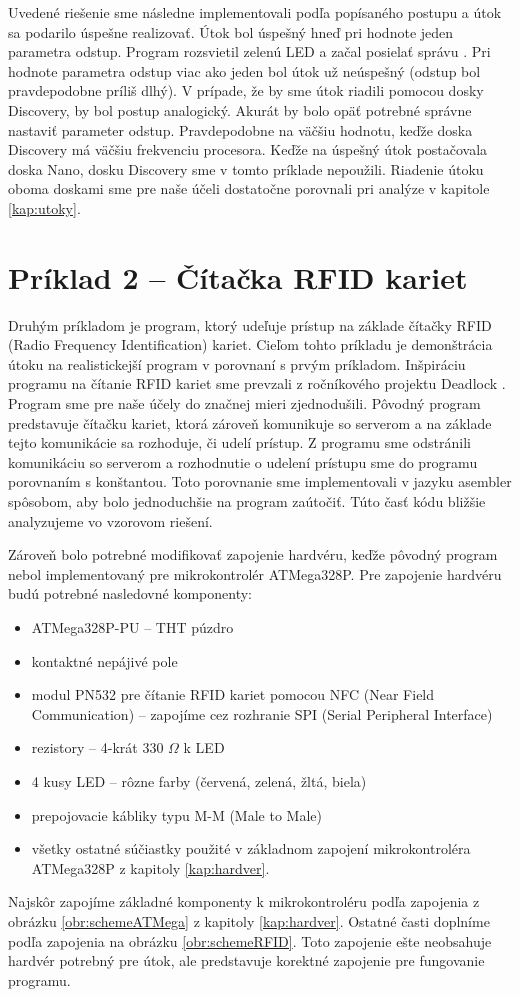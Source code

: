 Uvedené riešenie sme následne implementovali podľa popísaného postupu a útok sa podarilo úspešne realizovať. Útok bol úspešný hneď pri hodnote jeden parametra odstup. Program rozsvietil zelenú LED a začal posielať správu . Pri hodnote parametra odstup viac ako jeden bol útok už neúspešný (odstup bol pravdepodobne príliš dlhý). V prípade, že by sme útok riadili pomocou dosky Discovery, by bol postup analogický. Akurát by bolo opäť potrebné správne nastaviť parameter odstup. Pravdepodobne na väčšiu hodnotu, keďže doska Discovery má väčšiu frekvenciu procesora. Keďže na úspešný útok postačovala doska Nano, dosku Discovery sme v tomto príklade nepoužili. Riadenie útoku oboma doskami sme pre naše účeli dostatočne porovnali pri analýze v kapitole \ref{kap:utoky}.

\section{Príklad 2 -- Čítačka RFID kariet}
Druhým príkladom je program, ktorý udeľuje prístup na základe čítačky RFID (Radio Frequency Identification) kariet. Cieľom tohto príkladu je demonštrácia útoku na realistickejší program v porovnaní s prvým príkladom. Inšpiráciu programu na čítanie RFID kariet sme prevzali z ročníkového projektu Deadlock \cite{deadlock}. Program sme pre naše účely do značnej mieri zjednodušili. Pôvodný program predstavuje čítačku kariet, ktorá zároveň komunikuje so serverom a na základe tejto komunikácie sa rozhoduje, či udelí prístup. Z programu sme odstránili komunikáciu so serverom a rozhodnutie o udelení prístupu sme  do programu porovnaním s konštantou. Toto porovnanie sme implementovali v jazyku asembler spôsobom, aby bolo jednoduchšie na program zaútočiť. Túto časť kódu bližšie analyzujeme vo vzorovom riešení.

Zároveň bolo potrebné modifikovať zapojenie hardvéru, keďže pôvodný program nebol implementovaný pre mikrokontrolér ATMega328P. Pre zapojenie hardvéru budú potrebné nasledovné komponenty:
\begin{itemize}
    \item ATMega328P-PU -- THT púzdro
    \item kontaktné nepájivé pole
    \item modul PN532 pre čítanie RFID kariet pomocou NFC (Near Field Communication) -- zapojíme cez rozhranie SPI (Serial Peripheral Interface)
    \item rezistory -- 4-krát 330 $\Omega$ k LED
    \item 4 kusy LED -- rôzne farby (červená, zelená, žltá, biela)
    \item prepojovacie kábliky typu M-M (Male to Male)
    \item všetky ostatné súčiastky použité v základnom zapojení mikrokontroléra ATMega328P z kapitoly \ref{kap:hardver}.
\end{itemize}
Najskôr zapojíme základné komponenty k mikrokontroléru podľa zapojenia z obrázku \ref{obr:schemeATMega} z kapitoly \ref{kap:hardver}. Ostatné časti doplníme podľa zapojenia na obrázku \ref{obr:schemeRFID}. Toto zapojenie ešte neobsahuje hardvér potrebný pre útok, ale predstavuje korektné zapojenie pre fungovanie programu.

